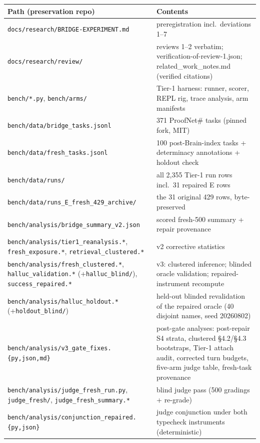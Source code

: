 \documentclass[10pt]{article}
\newcommand{\code}[1]{\texttt{#1}}
\begin{document}
\begin{center}\footnotesize
\begin{tabular}{@{}p{}p{}@{}}
\toprule
Path (preservation repo) & Contents \\
\midrule
\code{docs/research/BRIDGE-EXPERIMENT.md} & preregistration incl.\ deviations 1--7 \\
\code{docs/research/review/} & reviews 1--2 verbatim; verification-of-review-1.json; related\_work\_notes.md (verified citations) \\
\code{bench/*.py}, \code{bench/arms/} & Tier-1 harness: runner, scorer, REPL rig, trace analysis, arm manifests \\
\code{bench/data/bridge\_tasks.jsonl} & 371 ProofNet\# tasks (pinned fork, MIT) \\
\code{bench/data/fresh\_tasks.jsonl} & 100 post-Brain-index tasks + determinacy annotations + holdout check \\
\code{bench/data/runs/} & all 2,355 Tier-1 run rows incl.\ 31 repaired E rows \\
\code{bench/data/runs\_E\_fresh\_429\_archive/} & the 31 original 429 rows, byte-preserved \\
\code{bench/analysis/bridge\_summary\_v2.json} & scored fresh-500 summary + repair provenance \\
\code{bench/analysis/tier1\_reanalysis.*}, \code{fresh\_exposure.*}, \code{retrieval\_clustered.*} & v2 corrective statistics \\
\code{bench/analysis/fresh\_clustered.*}, \code{halluc\_validation.*} (+\code{halluc\_blind/}), \code{success\_repaired.*} & v3: clustered inference; blinded oracle validation; repaired-instrument recompute \\
\code{bench/analysis/halluc\_holdout.*} (+\code{holdout\_blind/}) & held-out blinded revalidation of the repaired oracle (40 disjoint names, seed 20260802) \\
\code{bench/analysis/v3\_gate\_fixes.\{py,json,md\}} & post-gate analyses: post-repair S4 strata, clustered \S 4.2/\S 4.3 bootstraps, Tier-1 attach audit, corrected turn budgets, five-arm judge table, fresh-task provenance \\
\code{bench/analysis/judge\_fresh\_run.py}, \code{judge\_fresh/}, \code{judge\_fresh\_summary.*} & blind judge pass (500 gradings + re-grade) \\
\code{bench/analysis/conjunction\_repaired.\{py,json\}} & judge conjunction under both typecheck instruments (deterministic) \\

\end{tabular}
\end{center}
\end{document}
